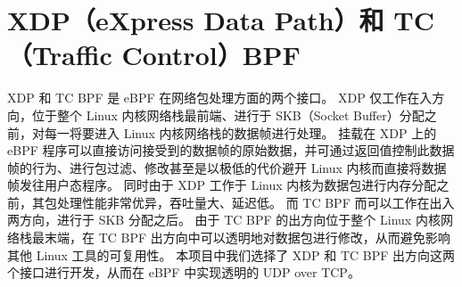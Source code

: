 \section{XDP（eXpress Data Path）和 TC（Traffic Control）BPF}

XDP 和 TC BPF 是 eBPF 在网络包处理方面的两个接口。
XDP 仅工作在入方向，位于整个 Linux 内核网络栈最前端、进行于 SKB（Socket Buffer）分配之前，对每一将要进入 Linux 内核网络栈的数据帧进行处理。
挂载在 XDP 上的 eBPF 程序可以直接访问接受到的数据帧的原始数据，并可通过返回值控制此数据帧的行为、进行包过滤、修改甚至是以极低的代价避开 Linux 内核而直接将数据帧发往用户态程序。
同时由于 XDP 工作于 Linux 内核为数据包进行内存分配之前，其包处理性能非常优异，吞吐量大、延迟低。
而 TC BPF 而可以工作在出入两方向，进行于 SKB 分配之后。
由于 TC BPF 的出方向位于整个 Linux 内核网络栈最末端，在 TC BPF 出方向中可以透明地对数据包进行修改，从而避免影响其他 Linux 工具的可复用性。
本项目中我们选择了 XDP 和 TC BPF 出方向这两个接口进行开发，从而在 eBPF 中实现透明的 UDP over TCP。
